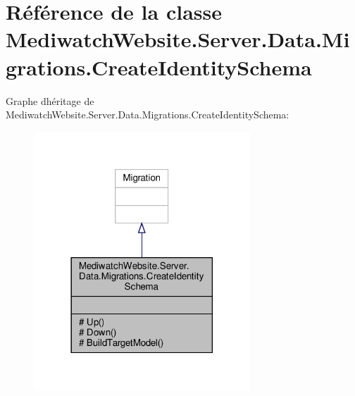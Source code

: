 \hypertarget{class_mediwatch_website_1_1_server_1_1_data_1_1_migrations_1_1_create_identity_schema}{}\section{Référence de la classe Mediwatch\+Website.\+Server.\+Data.\+Migrations.\+Create\+Identity\+Schema}
\label{class_mediwatch_website_1_1_server_1_1_data_1_1_migrations_1_1_create_identity_schema}


Graphe d\textquotesingle{}héritage de Mediwatch\+Website.\+Server.\+Data.\+Migrations.\+Create\+Identity\+Schema\+:
\nopagebreak
\begin{figure}[H]
\begin{center}
\leavevmode
\includegraphics[width=230pt]{class_mediwatch_website_1_1_server_1_1_data_1_1_migrations_1_1_create_identity_schema__inherit__graph}
\end{center}
\end{figure}


